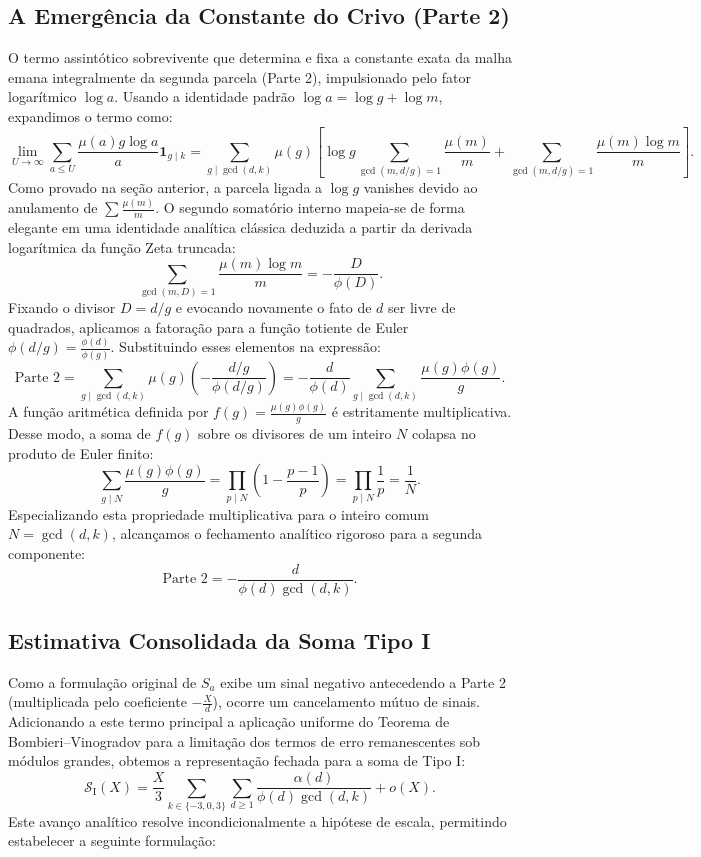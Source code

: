 \documentclass[12pt]{article}
\theoremstyle{definition}
\theoremstyle{remark}
\newcommand{\SI}{\mathcal{S}_{\mathrm{I}}}
\begin{document}
	\subsection{A Emergência da Constante do Crivo (Parte 2)}
	
	O termo assintótico sobrevivente que determina e fixa a constante exata da malha emana integralmente da segunda parcela (Parte 2), impulsionado pelo fator logarítmico $\log a$. Usando a identidade padrão $\log a = \log g + \log m$, expandimos o termo como:
	\[
	\lim_{U \to \infty} \sum_{a \le U} \frac{\mu(a) g \log a}{a} \mathbf{1}_{g \mid k} = \sum_{g \mid \gcd(d,k)} \mu(g) \left[ \log g \sum_{\gcd(m, d/g) = 1} \frac{\mu(m)}{m} + \sum_{\gcd(m, d/g) = 1} \frac{\mu(m) \log m}{m} \right].
	\]
	Como provado na seção anterior, a parcela ligada a $\log g$ vanishes devido ao anulamento de $\sum \frac{\mu(m)}{m}$. O segundo somatório interno mapeia-se de forma elegante em uma identidade analítica clássica deduzida a partir da derivada logarítmica da função Zeta truncada:
	\[
	\sum_{\gcd(m, D) = 1} \frac{\mu(m) \log m}{m} = -\frac{D}{\phi(D)}.
	\]
	Fixando o divisor $D = d/g$ e evocando novamente o fato de $d$ ser livre de quadrados, aplicamos a fatoração para a função totiente de Euler $\phi(d/g) = \frac{\phi(d)}{\phi(g)}$. Substituindo esses elementos na expressão:
	\[
	\text{Parte 2} = \sum_{g \mid \gcd(d,k)} \mu(g) \left( -\frac{d/g}{\phi(d/g)} \right) = -\frac{d}{\phi(d)} \sum_{g \mid \gcd(d,k)} \frac{\mu(g)\phi(g)}{g}.
	\]
	A função aritmética definida por $f(g) = \frac{\mu(g)\phi(g)}{g}$ é estritamente multiplicativa. Desse modo, a soma de $f(g)$ sobre os divisores de um inteiro $N$ colapsa no produto de Euler finito:
	\[
	\sum_{g \mid N} \frac{\mu(g)\phi(g)}{g} = \prod_{p \mid N} \left( 1 - \frac{p-1}{p} \right) = \prod_{p \mid N} \frac{1}{p} = \frac{1}{N}.
	\]
	Especializando esta propriedade multiplicativa para o inteiro comum $N = \gcd(d,k)$, alcançamos o fechamento analítico rigoroso para a segunda componente:
	\[
	\text{Parte 2} = -\frac{d}{\phi(d) \gcd(d,k)}.
	\]
	
	\subsection{Estimativa Consolidada da Soma Tipo I}
	
	Como a formulação original de $S_a$ exibe um sinal negativo antecedendo a Parte 2 (multiplicada pelo coeficiente $-\frac{X}{d}$), ocorre um cancelamento mútuo de sinais. Adicionando a este termo principal a aplicação uniforme do Teorema de Bombieri--Vinogradov \cite[Teo.~2.1]{vaughan} para a limitação dos termos de erro remanescentes sob módulos grandes, obtemos a representação fechada para a soma de Tipo I:
	\[
	\SI(X) = \frac{X}{3} \sum_{k \in \{-3,0,3\}} \sum_{d \ge 1} \frac{\alpha(d)}{\phi(d) \gcd(d,k)} + o(X).
	\]
	Este avanço analítico resolve incondicionalmente a hipótese de escala, permitindo estabelecer a seguinte formulação:
	
\end{document}
